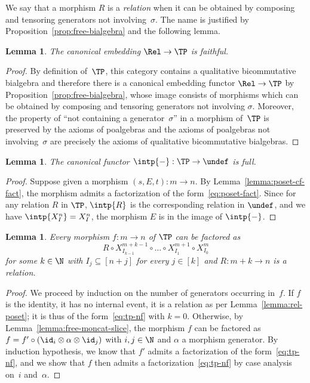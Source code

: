 \documentclass[submission,copyright,creativecommons]{eptcs}
\let\P\undef
\newtheorem{lemma}[theorem]{Lemma}
\theoremstyle{definition}
\theoremstyle{remark}
\begin{document}
\noindent
We say that a morphism $R$ is a \emph{relation} when it can be obtained by
composing and tensoring generators not involving~$\sigma$. The name is justified
by Proposition~\ref{prop:free-bialgebra} and the following lemma.

\begin{lemma}
  The canonical embedding $\Rel\to\TP$ is faithful.
\end{lemma}
\begin{proof}
  By definition of~$\TP$, this category contains a qualitative bicommutative
  bialgebra and therefore there is a canonical embedding functor $\Rel\to\TP$ by
  Proposition~\ref{prop:free-bialgebra}, whose image consists of morphisms which
  can be obtained by composing and tensoring generators not involving
  $\sigma$. Moreover, the property of ``not containing a generator~$\sigma$'' in
  a morphism of~$\TP$ is preserved by the axioms of poalgebras and the axioms of
  poalgebras not involving~$\sigma$ are precisely the axioms of qualitative
  bicommutative bialgebras.
\end{proof}

\begin{lemma}
  \label{lemma:tp-p-full}
  The canonical functor $\intp{-}:\TP\to\P$ is full.
\end{lemma}
\begin{proof}
  Suppose given a morphism $(s,E,t):m\to n$. By
  Lemma~\ref{lemma:poset-cf-fact}, the morphism admits a factorization of the
  form~\eqref{eq:poset-fact}. Since for any relation $R$ in $\TP$, $\intp{R}$ is
  the corresponding relation in $\P$, and we have $\intp{X^n_I}=X^n_I$, the
  morphism $E$ is in the image of $\intp{-}$.
\end{proof}

\begin{lemma}
  \label{lemma:tp-cf}
  Every morphism $f:m\to n$ of $\TP$ can be factored as
  \begin{equation}
    \label{eq:tp-nf}
    R\circ X^{m+k-1}_{I_{k-1}}\circ\ldots\circ X^{m+1}_{I_1}\circ X^m_{I_0}
  \end{equation}
  for some $k\in\N$ with $I_j\subseteq[n+j]$ for every $j\in[k]$ and $R:m+k\to
  n$ is a relation.
\end{lemma}
\begin{proof}
  We proceed by induction on the number of generators occurring in~$f$. If $f$
  is the identity, it has no internal event, \ie it is a relation as per
  Lemma~\ref{lemma:rel-poset}; it is thus of the form~\eqref{eq:tp-nf} with
  $k=0$. Otherwise, by Lemma~\ref{lemma:free-moncat-slice}, the morphism $f$ can
  be factored as $f=f'\circ(\id_i\otimes\alpha\otimes\id_j)$ with $i,j\in\N$ and
  $\alpha$ a morphism generator. By induction hypothesis, we know that $f'$
  admits a factorization of the form~\eqref{eq:tp-nf}, and we show that $f$ then
  admits a factorization~\eqref{eq:tp-nf} by case analysis on~$i$ and~$\alpha$.
\end{proof}
\end{document}
